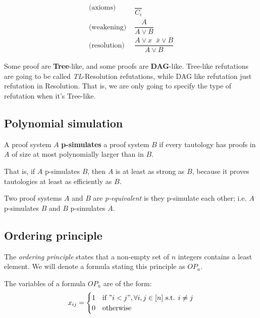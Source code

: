     \begin{align}
        \text{(axioms) }        & \dfrac{}{C_i}\\
        \text{(weakening) }     & \dfrac{A}{A \vee B}\\
        \text{(resolution) }    & \dfrac{A \vee x \;\; \bar{x} \vee B}{A \vee B}
    \end{align}

    Some proof are \textbf{Tree}-like, and some proofs are \textbf{DAG}-like.
    Tree-like refutations are going to be called \textit{TL}-Resolution refutations, while DAG like refutation just refutation in Resolution.
    That is, we are only going to specify the type of refutation when it's Tree-like.


\subsection{Polynomial simulation}\label{subsec:poly_simulation}

    \begin{definition}[p-simulation]\label{def:p_simulation}
        A proof system $A$ \textbf{p-simulates} a proof system $B$ if every tautology has proofs in $A$ of size at most polynomially larger than in $B$.        
    \end{definition}

    That is, if $A$ p-simulates $B$, then $A$ is at least as strong as $B$, because it proves tautologies at least as efficiently as $B$.

    \begin{definition}[p-equivalence]\label{def:p_equivalence}
        Two proof systems $A$ and $B$ are \textit{p-equivalent} is they p-simulate each other; i.e. $A$ p-simulates $B$ and $B$ p-simulates $A$.
    \end{definition}


\subsection{Ordering principle}\label{subsec:order_principle}
    The \textit{ordering principle} states that a non-empty set of $n$ integers contains a least element.
    We will denote a formula stating this principle as $OP_n$.

    The variables of a formula $OP_n$ are of the form:
    \begin{equation}\label{eq:var_ordprinciple}
        x_{ij} = 
        \begin{cases}
            1 & \text{if } "i<j", \forall i,j \in [n] \text{ s.t. } i \neq j \\
            0 & \text{otherwise}
        \end{cases}
    \end{equation}

